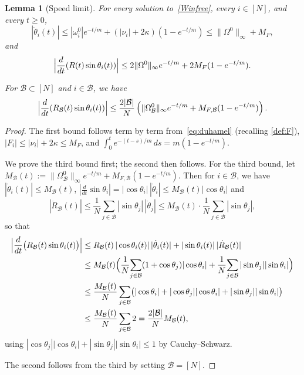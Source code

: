\documentclass[11pt,reqno]{amsart}
\newtheorem{lemma}{Lemma}[section]
\theoremstyle{definition}
\theoremstyle{remark}
\begin{document}
\begin{lemma}[Speed limit]\label{lem:speedlim}
For every solution to~\eqref{Winfree}, every $i\in[N]$, and every $t\ge 0$,
\[
|\dot\theta_i(t)|\le |\omega_i^0| e^{-t/m}+(|\nu_i|+2\kappa)(1-e^{-t/m})\le\|\Omega^0\|_\infty+M_F,
\]
and
\[
\Bigl|\frac{d}{dt}(R(t)\sin\theta_i(t))\Bigr|\le 2\|\Omega^0\|_\infty e^{-t/m}+2 M_F(1-e^{-t/m}).
\]

For $\mathcal{B}\subset [N]$ and $i\in \mathcal{B}$, we have
\[
\Bigl|\frac{d}{dt}(R_\mathcal{B}(t)\sin\theta_i(t))\Bigr|\le \frac{2|\mathcal{B}|}{N}\left(\|\Omega_\mathcal{B}^0\|_\infty e^{-t/m}+M_{F,\mathcal{B}}(1-e^{-t/m})\right).
\]
\end{lemma}
\begin{proof}
The first bound follows term by term from~\eqref{eq:duhamel} (recalling \eqref{def:F}),
$|F_i|\le |\nu_i|+2\kappa \le M_F$, and
$\int_0^t e^{-(t-s)/m}\,ds=m(1-e^{-t/m})$.

We prove the third bound first; the second then follows. For the third bound, let
$M_\mathcal{B}(t):=\|\Omega_\mathcal{B}^0\|_\infty e^{-t/m}+M_{F,\mathcal{B}}(1-e^{-t/m})$. Then for $i\in \mathcal{B}$, we have $|\dot\theta_i(t)|\le M_\mathcal{B}(t)$, 
$|\tfrac{d}{dt}\sin\theta_i|=|\cos\theta_i|\,|\dot\theta_i|\le M_\mathcal{B}(t)|\cos\theta_i|$ and
\begin{equation}\label{eq:R-deriv}
	|\dot R_\mathcal{B}(t)|\le\frac1N\sum_{j\in \mathcal{B}}|\sin\theta_j|\,|\dot\theta_j|\le M_\mathcal{B}(t)\cdot\frac1N\sum_{j\in \mathcal{B}}|\sin\theta_j|,
\end{equation}
so that
\begin{align*}
	\Bigl|\frac{d}{dt}\bigl(R_\mathcal{B}(t)\sin\theta_i(t)\bigr)\Bigr|
	&\le R_\mathcal{B}(t)\,|\cos\theta_i(t)|\,|\dot\theta_i(t)|+|\sin\theta_i(t)|\,|\dot R_\mathcal{B}(t)|\\
	&\le M_\mathcal{B}(t)\Bigl(\frac1N\!\sum_{j\in \mathcal{B}}(1+\cos\theta_j)|\cos\theta_i|+\frac1N\!\sum_{j\in \mathcal{B}}|\sin\theta_j||\sin\theta_i|\Bigr)\\
	&\le\frac{M_\mathcal{B}(t)}{N}\sum_{j\in \mathcal{B}}\bigl(|\cos\theta_i|+|\cos\theta_j||\cos\theta_i|+|\sin\theta_j||\sin\theta_i|\bigr)\\
	&\le\frac{M_\mathcal{B}(t)}{N}\sum_{j\in \mathcal{B}} 2=\frac{2|\mathcal{B}|}{N}M_\mathcal{B}(t),
\end{align*}
using $|\cos\theta_j||\cos\theta_i|+|\sin\theta_j||\sin\theta_i|\le1$
by Cauchy--Schwarz.

The second follows from the third by setting $\mathcal{B}=[N]$.
\end{proof}
\end{document}
